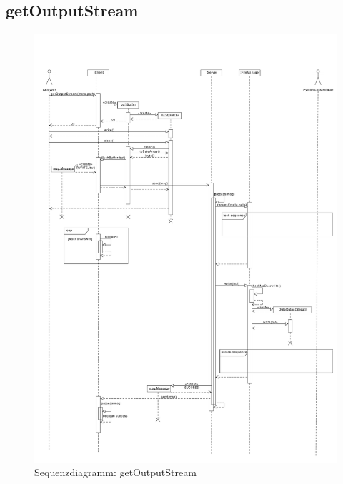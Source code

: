 \subsection {getOutputStream}
\begin{figure}[h]
	\centering
	\label{design:dia:sqc:getOutputStream}
	\includegraphics[width=\textwidth]{design/frontend/sequence/get-output-stream-sequence.pdf}
	\caption{Sequenzdiagramm: getOutputStream}
\end{figure}

